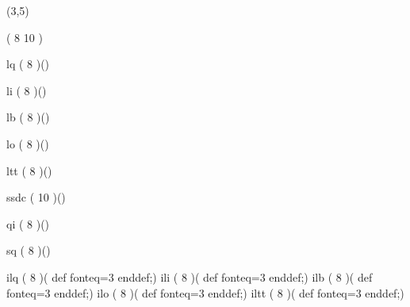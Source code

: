 %
%
%
%
%
%
%

\lhvercheck(3,5)

%
\MakeFileHeadstrue %
     \tablevalues                         (       8   10              )

\def\ifont{}
     \makefont \ifont\fonttwoletters lq   (       8                   )()

     \makefont \ifont\fonttwoletters li   (       8                   )()

     \makefont \ifont\fonttwoletters lb   (       8                   )()

     \makefont \ifont\fonttwoletters lo   (       8                   )()

     \makefont \ifont\fonttwoletters ltt  (       8                   )()

     \makefont \ifont\fonttwoletters ssdc (           10              )()

     \makefont \ifont\fonttwoletters qi   (       8                   )()

     \makefont \ifont\fonttwoletters sq   (       8                   )()

\def\ifont{i}
     \makefont \ifont\fonttwoletters lq  (       8                   )(%
                                                        def fonteq=3 enddef;)
     \makefont \ifont\fonttwoletters li  (       8                   )(%
                                                        def fonteq=3 enddef;)
     \makefont \ifont\fonttwoletters lb  (       8                   )(%
                                                        def fonteq=3 enddef;)
     \makefont \ifont\fonttwoletters lo  (       8                   )(%
                                                        def fonteq=3 enddef;)
     \makefont \ifont\fonttwoletters ltt (       8                   )(%
                                                        def fonteq=3 enddef;)

\endinput

